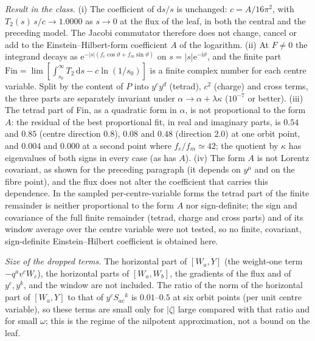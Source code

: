 \emph{Result in the class.} (i) The coefficient of \(\mathrm ds/s\) is unchanged: \(c=A/16\pi^2\), with \(T_2(s)\,s/c\to1.0000\) as \(s\to0\) at the flux of the leaf, in both the central and the preceding model. The Jacobi commutator therefore does not change, cancel or add to the Einstein--Hilbert-form coefficient \(A\) of the logarithm. (ii) At \(F\ne0\) the integrand decays as \(\mathrm e^{-|s|(f_e\cos\vartheta+f_m\sin\vartheta)}\) on \(s=|s|\mathrm e^{-\mathrm i\vartheta}\), and the finite part \(\mathrm{Fin}=\lim[\int_{s_0}^\infty T_2\,\mathrm ds-c\ln(1/s_0)]\) is a finite complex number for each centre variable. Split by the content of \(P\) into \(y^cy^d\) (tetrad), \(c^2\) (charge) and cross terms, the three parts are separately invariant under \(\alpha\to\alpha+\lambda\kappa\) (\(10^{-7}\) or better). (iii) The tetrad part of Fin, as a quadratic form in \(\alpha\), is not proportional to the form \(A\): the residual of the best proportional fit, in real and imaginary parts, is \(0.54\) and \(0.85\) (centre direction \(0.8\)), \(0.08\) and \(0.48\) (direction \(2.0\)) at one orbit point, and \(0.004\) and \(0.000\) at a second point where \(f_e/f_m\simeq42\); the quotient by \(\kappa\) has eigenvalues of both signs in every case (as has \(A\)). (iv) The form \(A\) is not Lorentz covariant, as shown for the preceding paragraph (it depends on \(y^\mu\) and on the fibre point), and the flux does not alter the coefficient that carries this dependence. In the sampled per-centre-variable forms the tetrad part of the finite remainder is neither proportional to the form \(A\) nor sign-definite; the sign and covariance of the full finite remainder (tetrad, charge and cross parts) and of its window average over the centre variable were not tested, so no finite, covariant, sign-definite Einstein--Hilbert coefficient is obtained here.



\emph{Size of the dropped terms.} The horizontal part of \([W_a,Y]\) (the weight-one term \(-q^av^cW_c\)), the horizontal parts of \([W_a,W_b]\), the gradients of the flux and of \(y^c,y^k\), and the window are not included. The ratio of the norm of the horizontal part of \([W_a,Y]\) to that of \(y^cS_{ac}{}^k\) is \(0.01\)--\(0.5\) at six orbit points (per unit centre variable), so these terms are small only for \(|\zeta|\) large compared with that ratio and for small \(\omega\); this is the regime of the nilpotent approximation, not a bound on the leaf.



